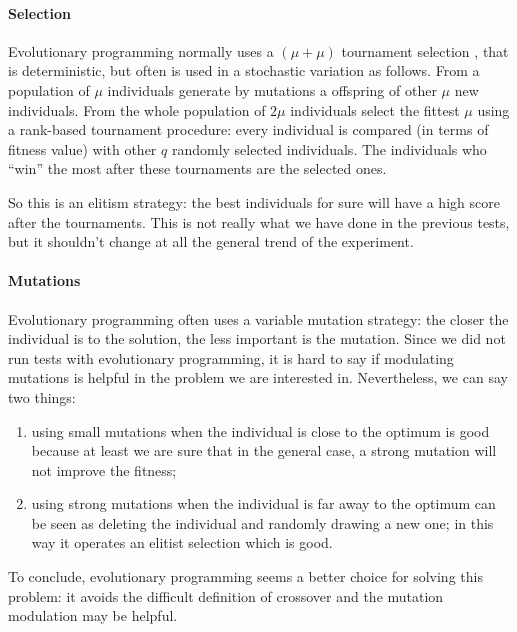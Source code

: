\documentclass{report}
\begin{document}
\paragraph{Selection}
Evolutionary programming normally uses a $(\mu + \mu)$ tournament selection \cite{introtoec}, that is deterministic, but often is used in a stochastic variation as follows. From a population of $\mu$ individuals generate by mutations a offspring of other $\mu$ new individuals. From the whole population of $2\mu$ individuals select the fittest $\mu$ using a rank-based tournament procedure: every individual is compared (in terms of fitness value) with other $q$ randomly selected individuals. The individuals who ``win'' the most after these tournaments are the selected ones. 

So this is an elitism strategy: the best individuals for sure will have a high score after the tournaments. This is not really what we have done in the previous tests, but it shouldn't change at all the general trend of the experiment.

\paragraph{Mutations}
Evolutionary programming often uses a variable mutation strategy: the closer the individual is to the solution, the less important is the mutation. Since we did not run tests with evolutionary programming, it is hard to say if modulating mutations is helpful in the problem we are interested in. Nevertheless, we can say two things:
\begin{enumerate}
\item using small mutations when the individual is close to the optimum is good because at least we are sure that in the general case, a strong mutation will not improve the fitness;
\item using strong mutations when the individual is far away to the optimum can be seen as deleting the individual and randomly drawing a new one; in this way it operates an elitist selection which is good.
\end{enumerate}



To conclude, evolutionary programming seems a better choice for solving this problem: it avoids the difficult definition of crossover and the mutation modulation may be helpful.



\end{document}
